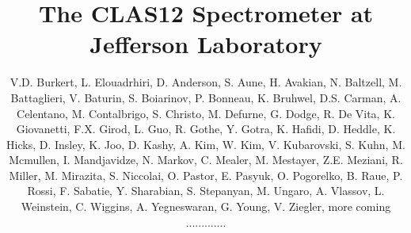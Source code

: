 \documentclass[final,3p,twocolumn]{elsarticle}
\begin{document}
\begin{frontmatter}
\title{The CLAS12 Spectrometer at Jefferson Laboratory}
\author{V.D. Burkert, L. Elouadrhiri, D. Anderson, S. Aune, H. Avakian, N. Baltzell, M. Battaglieri,  V. Baturin,
  S. Boiarinov, P. Bonneau, K. Bruhwel, D.S. Carman, A. Celentano, M. Contalbrigo, S. Christo, M. Defurne, G. Dodge,
  R. De Vita, K. Giovanetti, F.X. Girod, L. Guo, R. Gothe, Y. Gotra, K. Hafidi, D. Heddle, K. Hicks, D. Insley, K. Joo,
  D. Kashy, A. Kim, W. Kim, V. Kubarovski, S. Kuhn, M. Mcmullen, I. Mandjavidze, N. Markov, C. Mealer, M. Mestayer,
  Z.E. Meziani, R. Miller, M. Mirazita, S. Niccolai, O. Pastor, E. Pasyuk, O. Pogorelko, B. Raue, P. Rossi, F. Sabatie,
  Y. Sharabian, S. Stepanyan, M. Ungaro, A. Vlassov, L. Weinstein, C. Wiggins, A. Yegneswaran, G. Young, V. Ziegler,
  more coming ............. }
\address{12000 Jefferson Avenue, Newport News, Virginia, 23606}
\address{ Argonne National Laboratory, Argonne, Illinois, 60439, USA}
\address{Christopher Newport University, Newport News, Virginia 23605, USA} 
\address{University of Connecticut, Storrs, Connecticut 06269, USA} 
\address{Florida International University, Miami, Florida, 33199, USA} 
\address{IRFU, CEA, Universit{\'e} Paris-Saclay, F-91191 Gif-sur-Yvette, France}
\address{INFN, Sezione di Genova, 16146 Genova, Italy}
\address{Institut de Physique Nucl{\'e}aire, IN2P3-CNRS, Universit{\'e} Paris-Sud,  Universit{\'e} Paris-Saclay,
}
\end{frontmatter}
\end{document}
